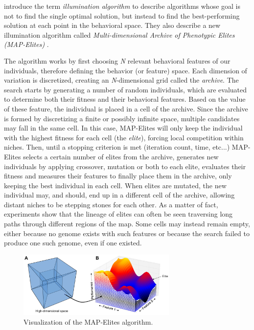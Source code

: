 \documentclass{Configuration_Files/PoliMi3i_thesis}
\begin{document}
 introduce the term \textit{illumination algorithm} to describe algorithms whose goal is not to find the single optimal solution, but instead to find the best-performing solution at each point in the behavioral space. They also describe a new illumination algorithm called \textit{Multi-dimensional Archive of Phenotypic Elites (MAP-Elites)} \cite{mouret_illuminating_2015}. 

The algorithm works by first choosing \textit{N} relevant behavioral features of our individuals, therefore defining the behavior (or feature) space. Each dimension of variation is discretized, creating an \textit{N}-dimensional grid called the \textit{archive}. The search starts by generating a number of random individuals, which are evaluated to determine both their fitness and their behavioral features. Based on the value of these feature, the individual is placed in a cell of the archive. Since the archive is formed by discretizing a finite or possibly infinite space, multiple candidates may fall in the same cell. In this case, MAP-Elites will only keep the individual with the highest fitness for each cell (the \textit{elite}), forcing local competition within niches. Then, until a stopping criterion is met (iteration count, time, etc...) MAP-Elites selects a certain number of elites from the archive, generates new individuals by applying crossover, mutation or both to each elite, evaluates their fitness and measures their features to finally place them in the archive, only keeping the best individual in each cell. When elites are mutated, the new individual may, and should, end up in a different cell of the archive, allowing distant niches to be stepping stones for each other. As a matter of fact, experiments show that the lineage of elites can often be seen traversing long paths through different regions of the map. Some cells may instead remain empty, either because no genome exists with such features or because the search failed to produce one such genome, even if one existed. \cite{mouret_illuminating_2015}

\begin{figure}[H]
    \centering
    \includegraphics[width=0.7\textwidth]{Images/MAPElites.png}
    \caption{Visualization of the MAP-Elites algorithm.}
    \label{fig:mapelites}
\end{figure}
\end{document}
